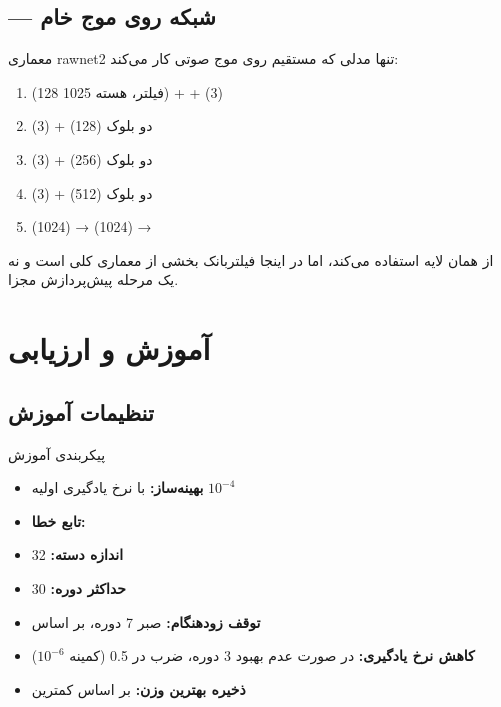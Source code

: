 \documentclass[12pt]{report}
\begin{document}
\section{ — شبکه روی موج خام}

\begin{tecbox}{معماری }{rawnet2}
    تنها مدلی که مستقیم روی موج صوتی کار می‌کند:
    \begin{enumerate}[noitemsep]
        \item {}(128 فیلتر، هسته 1025) +  + (3)
        \item دو بلوک (128) + (3)
        \item دو بلوک (256) + (3)
        \item دو بلوک (512) + (3)
        \item {}(1024) → (1024) → 
    \end{enumerate}
\end{tecbox}

\begin{notebox}
     از همان لایه  استفاده می‌کند، اما در اینجا
    فیلتربانک بخشی از معماری کلی است و نه یک مرحله پیش‌پردازش مجزا.
\end{notebox}

\chapter{آموزش و ارزیابی}

\section{تنظیمات آموزش}

\begin{genbox}{پیکربندی آموزش}
\begin{itemize}[noitemsep]
    \item \textbf{بهینه‌ساز:}  با نرخ یادگیری اولیه $10^{-4}$
    \item \textbf{تابع خطا:} 
    \item \textbf{اندازه دسته:} 32
    \item \textbf{حداکثر دوره:} 30
    \item \textbf{توقف زودهنگام:} صبر 7 دوره، بر اساس 
    \item \textbf{کاهش نرخ یادگیری:} در صورت عدم بهبود 3 دوره، ضرب در 0.5 (کمینه $10^{-6}$)
    \item \textbf{ذخیره بهترین وزن:} بر اساس کمترین 
\end{itemize}
\end{genbox}
\end{document}
